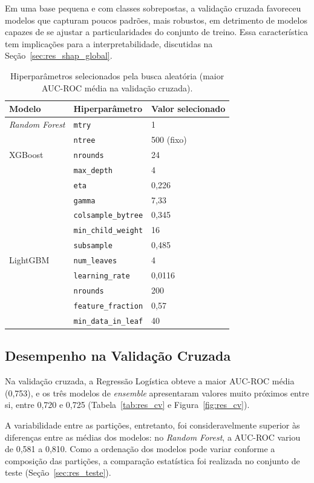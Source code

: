 Em uma base pequena e com classes sobrepostas, a validação cruzada favoreceu modelos que capturam poucos padrões, mais robustos, em detrimento de modelos capazes de se ajustar a particularidades do conjunto de treino. Essa característica tem implicações para a interpretabilidade, discutidas na Seção~\ref{sec:res_shap_global}.

\begin{table}[htbp]
\centering
\begin{tabular}{lll}
\hline
\textbf{Modelo} & \textbf{Hiperparâmetro} & \textbf{Valor selecionado} \\
\hline
\textit{Random Forest} & \texttt{mtry} & 1 \\
 & \texttt{ntree} & 500 (fixo) \\
\hline
XGBoost & \texttt{nrounds} & 24 \\
 & \texttt{max\_depth} & 4 \\
 & \texttt{eta} & 0,226 \\
 & \texttt{gamma} & 7,33 \\
 & \texttt{colsample\_bytree} & 0,345 \\
 & \texttt{min\_child\_weight} & 16 \\
 & \texttt{subsample} & 0,485 \\
\hline
LightGBM & \texttt{num\_leaves} & 4 \\
 & \texttt{learning\_rate} & 0,0116 \\
 & \texttt{nrounds} & 200 \\
 & \texttt{feature\_fraction} & 0,57 \\
 & \texttt{min\_data\_in\_leaf} & 40 \\
\hline
\end{tabular}
\caption{Hiperparâmetros selecionados pela busca aleatória (maior AUC-ROC média na validação cruzada).}
\label{tab:res_hiper}
\end{table}

\subsection{Desempenho na Validação Cruzada}

Na validação cruzada, a Regressão Logística obteve a maior AUC-ROC média (0,753), e os três modelos de \textit{ensemble} apresentaram valores muito próximos entre si, entre 0,720 e 0,725 (Tabela~\ref{tab:res_cv} e Figura~\ref{fig:res_cv}).

A variabilidade entre as partições, entretanto, foi consideravelmente superior às diferenças entre as médias dos modelos: no \textit{Random Forest}, a AUC-ROC variou de 0,581 a 0,810. Como a ordenação dos modelos pode variar conforme a composição das partições, a comparação estatística foi realizada no conjunto de teste (Seção~\ref{sec:res_teste}).

